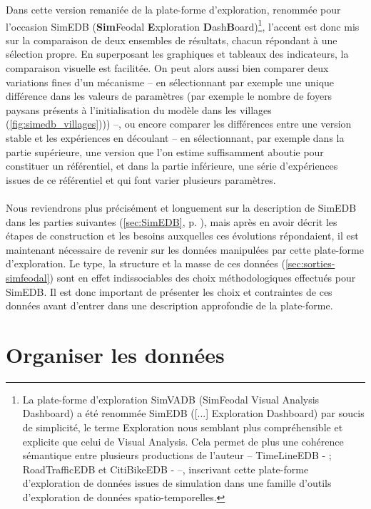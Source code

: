	Dans cette version remaniée de la plate-forme d'exploration, renommée pour l'occasion SimEDB (\textbf{Sim}Feodal \textbf{E}xploration \textbf{D}ash\textbf{B}oard)\footnote{
		La plate-forme d'exploration SimVADB (SimFeodal Visual Analysis Dashboard) a été renommée SimEDB ([...] Exploration Dashboard) par soucis de simplicité, le terme \og Exploration\fg{} nous semblant plus compréhensible et explicite que celui de Visual Analysis. Cela permet de plus une cohérence sémantique entre plusieurs productions de l'auteur -- TimeLineEDB - \autocite{cura_timelineedb_2017}; RoadTrafficEDB et CitiBikeEDB - \autocite{cura_making_2017} --, inscrivant cette plate-forme d'exploration de données issues de simulation dans une \og famille \fg{} d'outils d'exploration de données spatio-temporelles.
	}, l'accent est donc mis sur la comparaison de deux ensembles de résultats, chacun répondant à une sélection propre.
	En superposant les graphiques et tableaux des indicateurs, la comparaison visuelle est facilitée.
	On peut alors aussi bien comparer deux variations fines d'un mécanisme -- en sélectionnant par exemple une unique différence dans les valeurs de paramètres (par exemple le nombre de foyers paysans présents à l'initialisation du modèle dans les villages (\cref{fig:simedb_villages}))) --, ou encore comparer les différences entre une version stable et les expériences en découlant -- en sélectionnant, par exemple dans la partie supérieure, une version que l'on estime suffisamment aboutie pour constituer un référentiel, et dans la partie inférieure, une série d'expériences issues de ce référentiel et qui font varier plusieurs paramètres.


	\paragraph*{}
	Nous reviendrons plus précisément et longuement sur la description de SimEDB dans les parties suivantes (\cref{sec:SimEDB}, p. \pageref{sec:SimEDB}), mais après en avoir décrit les étapes de construction et les besoins auxquelles ces évolutions répondaient, il est maintenant nécessaire de revenir sur les données manipulées par cette plate-forme d'exploration.
	Le type, la structure et la masse de ces données (\cref{sec:sorties-simfeodal}) sont en effet indissociables des choix méthodologiques effectués pour SimEDB.
	Il est donc important de présenter les choix et contraintes de ces données avant d'entrer dans une description approfondie de la plate-forme.

\section{Organiser les données}
